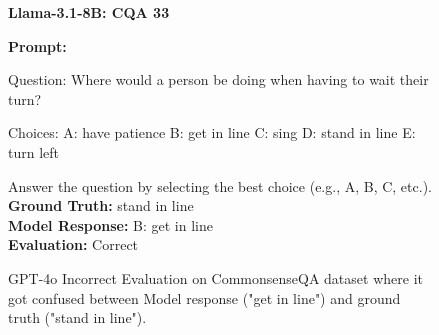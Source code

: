 \begin{figure*}
\begin{AIbox}{\bf{\large Llama-3.1-8B: CQA 33}}
\vspace{0.5cm}

\textbf{Prompt:} 

Question: Where would a person be doing when having to wait their turn? 

Choices: A: have patience B: get in line C: sing D: stand in line E: turn left 

Answer the question by selecting the best choice (e.g., A, B, C, etc.).
\\

\textbf{Ground Truth:} stand in line
\\

\textbf{Model Response:} B: get in line
\\

\textbf{Evaluation:} Correct


\end{AIbox}
\caption{GPT-4o Incorrect Evaluation on CommonsenseQA dataset where it got confused between Model response ("get in line") and ground truth ("stand in line"). }
\end{figure*}



























